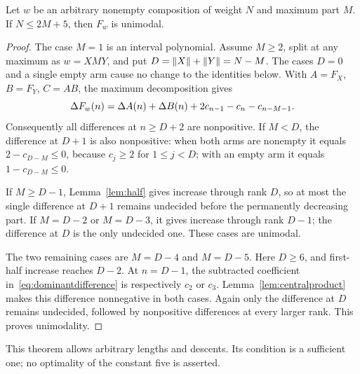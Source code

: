 \begin{theorem}\label{thm:dominant}
Let $w$ be an arbitrary nonempty composition of weight $N$ and maximum
part $M$. If $N\le2M+5$, then $F_w$ is unimodal.
\end{theorem}
\begin{proof}
The case $M=1$ is an interval polynomial. Assume $M\ge2$, split at
any maximum as $w=XMY$, and put $D=\lVert X\rVert+\lVert Y\rVert=N-M$.
The cases $D=0$ and a single empty arm cause no change to the identities
below. With $A=F_X$, $B=F_Y$, $C=AB$, the maximum decomposition gives
\begin{equation}\label{eq:dominantdifference}
 \Delta F_w(n)=\Delta A(n)+\Delta B(n)
       +2c_{n-1}-c_n-c_{n-M-1}.
\end{equation}
Consequently all differences at $n\ge D+2$ are nonpositive.
If $M<D$, the difference at $D+1$ is also nonpositive:
when both arms are nonempty it equals $2-c_{D-M}\le0$, because
$c_j\ge2$ for $1\le j<D$; with an empty arm it equals
$1-c_{D-M}\le0$.

If $M\ge D-1$, Lemma~\ref{lem:half} gives increase through rank $D$,
so at most the single difference at $D+1$ remains undecided before
the permanently decreasing part. If $M=D-2$ or $M=D-3$, it gives
increase through rank $D-1$; the difference at $D$ is the only
undecided one. These cases are unimodal.

The two remaining cases are $M=D-4$ and $M=D-5$. Here $D\ge6$,
and first-half increase reaches $D-2$. At $n=D-1$, the subtracted
coefficient in~\eqref{eq:dominantdifference} is respectively $c_2$
or $c_3$. Lemma~\ref{lem:centralproduct} makes this difference
nonnegative in both cases. Again only the difference at $D$ remains
undecided, followed by nonpositive differences at every larger rank.
This proves unimodality.
\end{proof}

This theorem allows arbitrary lengths and descents. Its condition is
a sufficient one; no optimality of the constant five is asserted.

